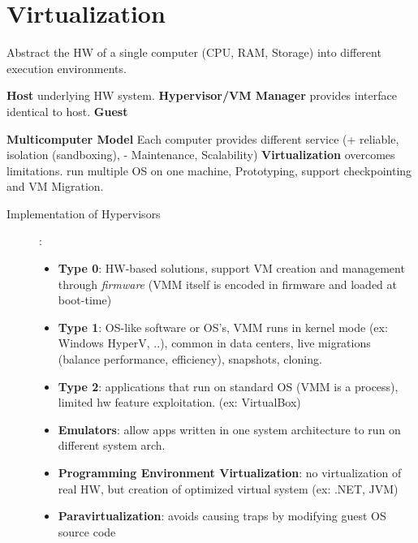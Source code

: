 \section*{Virtualization}
Abstract the HW of a single computer (CPU, RAM, Storage) into different execution environments. \\
\begin{description}[labelsep=0pt]
    \item[] \textbf{Host} underlying HW system. \textbf{Hypervisor/VM Manager} provides interface identical to host. \textbf{Guest}
    \item[History] \hspace{2pt} \textbf{Multicomputer Model} Each computer provides different service (+ reliable, isolation (sandboxing), - Maintenance, Scalability) \textbf{Virtualization} overcomes limitations. run multiple OS on one machine, Prototyping, support checkpointing and VM Migration. %
\end{description}
\begin{description}
    \item[Implementation of Hypervisors]:
        \begin{itemize}[label={}, labelsep=0pt]
        \item \textbf{Type 0}: HW-based solutions, support VM creation and management through \textit{firmware} (VMM itself is encoded in firmware and loaded at boot-time) %
        \item \textbf{Type 1}: OS-like software or OS's, VMM runs in kernel mode (ex: Windows HyperV, ..), common in data centers, live migrations (balance performance, efficiency), snapshots, cloning.
        \item \textbf{Type 2}: applications that run on standard OS (VMM is a process), limited hw feature exploitation. (ex: VirtualBox) %
        \item \textbf{Emulators}: allow apps written in one system architecture to run on different system arch.
        \item \textbf{Programming Environment Virtualization}: no virtualization of real HW, but creation of optimized virtual system (ex: .NET, JVM)
        \item \textbf{Paravirtualization}: avoids causing traps by modifying guest OS source code
    \end{itemize}
\end{description}

